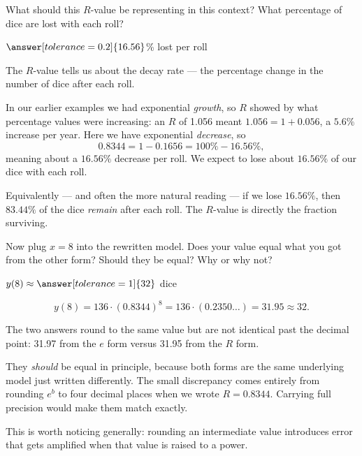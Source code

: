 \documentclass[12pt]{ximera}
\begin{document}
\begin{problem}
What should this $R$-value be representing in this context? What percentage of dice are
lost with each roll?

$\answer[tolerance=0.2]{16.56}$\% lost per roll

\begin{freeResponse}
\end{freeResponse}

\begin{solution}
The $R$-value tells us about the decay rate --- the percentage change in the number of
dice after each roll.

In our earlier examples we had exponential \emph{growth}, so $R$ showed by what percentage
values were increasing: an $R$ of 1.056 meant $1.056 = 1 + 0.056$, a $5.6\%$ increase per
year. Here we have exponential \emph{decrease}, so
\[
0.8344 = 1 - 0.1656 = 100\% - 16.56\%,
\]
meaning about a $16.56\%$ decrease per roll. We expect to lose about $16.56\%$ of our dice
with each roll.

Equivalently --- and often the more natural reading --- if we lose $16.56\%$, then
$83.44\%$ of the dice \emph{remain} after each roll. The $R$-value is directly the
fraction surviving.
\end{solution}
\end{problem}

\begin{problem}
Now plug $x = 8$ into the rewritten model. Does your value equal what you got from the
other form? Should they be equal? Why or why not?

$y(8) \approx \answer[tolerance=1]{32}$ dice

\begin{freeResponse}
\end{freeResponse}

\begin{solution}
\[
y(8) = 136 \cdot (0.8344)^8 = 136 \cdot (0.2350\ldots) = 31.95 \approx 32.
\]

The two answers round to the same value but are not identical past the decimal point:
31.97 from the $e$ form versus 31.95 from the $R$ form.

They \emph{should} be equal in principle, because both forms are the same underlying
model just written differently. The small discrepancy comes entirely from rounding $e^b$
to four decimal places when we wrote $R = 0.8344$. Carrying full precision would make
them match exactly.

This is worth noticing generally: rounding an intermediate value introduces error that
gets amplified when that value is raised to a power.
\end{solution}
\end{problem}
\end{document}
